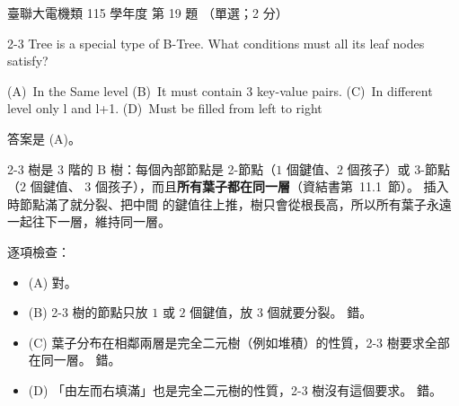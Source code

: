 \begin{pastexam}[label={px:ust-115-ee-ds-19}]{臺聯大電機類 115 學年度 第 19 題}
（單選；2 分）

2-3 Tree is a special type of B-Tree. What conditions must all its leaf nodes satisfy?

(A)~In the Same level \qquad (B)~It must contain 3 key-value pairs. \qquad
(C)~In different level only l and l+1. \qquad (D)~Must be filled from left to right
\end{pastexam}

\begin{pastsoln}
答案是 (A)。

2-3 樹是 $3$ 階的 B 樹：每個內部節點是 2-節點（$1$ 個鍵值、$2$ 個孩子）或 3-節點（$2$ 個鍵值、
$3$ 個孩子），而且\textbf{所有葉子都在同一層}（資結書第~11.1~節）。 插入時節點滿了就分裂、把中間
的鍵值往上推，樹只會從根長高，所以所有葉子永遠一起往下一層，維持同一層。

逐項檢查：
\begin{itemize}
\item (A) 對。
\item (B) 2-3 樹的節點只放 $1$ 或 $2$ 個鍵值，放 $3$ 個就要分裂。 錯。
\item (C) 葉子分布在相鄰兩層是完全二元樹（例如堆積）的性質，2-3 樹要求全部在同一層。 錯。
\item (D) 「由左而右填滿」也是完全二元樹的性質，2-3 樹沒有這個要求。 錯。
\end{itemize}
\end{pastsoln}

